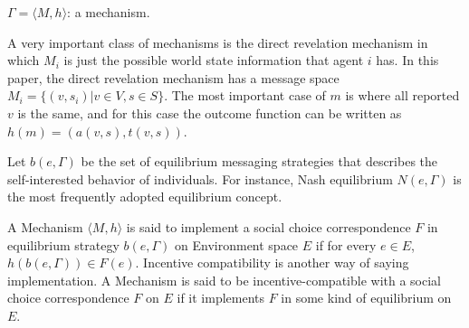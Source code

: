 $\Gamma=\langle M, h\rangle$: a mechanism.

A very important class of mechanisms is the direct revelation mechanism in which $M_i$ is just the possible world state information 
that agent $i$ has. In this paper, the direct revelation mechanism has a message space $M_i=\{(v, s_i)|v\in V, s \in S \}$. The most
important case of $m$ is where all reported $v$ is the same, and for this case the outcome function can be written as 
$h(m)=(a(v,s),t(v,s))$.

Let $b(e, \Gamma)$ be the set of equilibrium messaging strategies that describes the self-interested behavior of individuals.
For instance, Nash equilibrium $N(e,\Gamma)$ is the most frequently adopted equilibrium concept.

A Mechanism $\langle M, h\rangle$ is said to implement a social choice correspondence $F$ in equilibrium strategy 
$b(e, \Gamma)$ on Environment space $E$ if for every $e\in E$, $h(b(e,\Gamma))\in F(e)$.
Incentive compatibility is another way of saying implementation. A Mechanism is said to be incentive-compatible with a social choice
correspondence $F$ on $E$ if it implements $F$ in some kind of equilibrium on $E$. 








